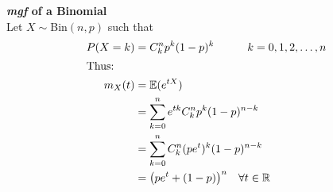 \documentclass{article}
\begin{document}
	\begin{exmp}
		\textbf{\emph{mgf} of a Binomial}\\
		Let $X \sim$Bin$(n, p )$ such that
		\begin{align*}
			P(X=k) &= C_k^n p^k (1-p)^k \quad \quad \quad k = 0,1,2,\dots, n \\
		\intertext{Thus:} 
			m_X(t) &= \mathbb{E} (e^{tX}) \\
			&= \sum_{k=0}^{n} e^{tk} C_k^n p^k (1-p)^{n-k} \\
			&= \sum_{k=0}^{n} C_k^n (pe^t)^k (1-p)^{n-k} \\
			&= \big( pe^t + (1-p) \big)^n \quad \forall t \in \mathbb{R}
		\end{align*}
	\end{exmp}
\end{document}
